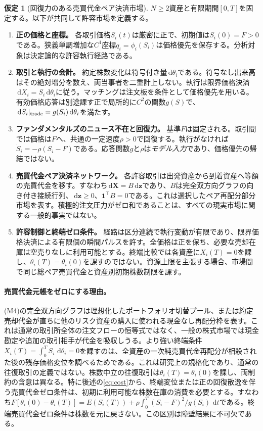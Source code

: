 \documentclass[11pt]{article}
\numberwithin{equation}{section}
\theoremstyle{definition}
\newtheorem{assumption}[theorem]{仮定}
\theoremstyle{remark}
\newcommand{\dd}{\,\mathrm{d}}
\newcommand{\one}{\mathbf{1}}
\begin{document}
\begin{assumption}[回復力のある売買代金ペア決済市場]\label{asmp:model}
$N\ge2$資産と有限期間$[0,T]$を固定する。以下が共同して許容市場を定義する。
\begin{enumerate}[label=\textup{(M\arabic*)},leftmargin= 2.9 em,itemsep= 0.20 em]
\item \textbf{正の価格と座標。} 各取引価格$S_i(t)$は厳密に正で、初期値は$S_i(0)=F>0$である。狭義単調増加な$C^1$座標$q_i=\phi_i(S_i)$は価格優先を保存する。分析対象は決定論的な許容執行経路である。
\item \textbf{取引と執行の会計。} 約定株数変化は符号付き量$\dd\theta_i$である。符号なし出来高はその絶対増分を数え、両当事者を二重計上しない。執行は限界価格決済$\dd X_i=S_i\dd\theta_i$に従う。マッチングは注文板を条件として価格優先を用いる。有効価格応答は別途課す正で局所的に$C^2$の関数$g(S)$で、$\dd S_i|_{\rm trade}=g(S_i)\dd\theta_i$を満たす。
\item \textbf{ファンダメンタルズのニュース不在と回復力。} 基準$F$は固定される。取引間では価格は$F$へ、共通の一定速度$\rho>0$で回復する。執行がなければ$\dot S_i=-\rho(S_i-F)$である。応答関数$g$と$\rho$は\emph{モデル入力}であり、価格優先の帰結ではない。
\item \textbf{売買代金ペア決済ネットワーク。} 各許容取引は出発資産から到着資産へ等額の売買代金を移す。すなわち$\dd\bm X=B\dd\bm z$であり、$B$は完全双方向グラフの向き付き接続行列、$\dd\bm z\ge0$、$\one^\top B=0$である。これは選択したペア再配分部分市場を表す。積極的注文圧力がゼロ和であることは、すべての現実市場に関する一般的事実ではない。
\item \textbf{許容制御と終端ゼロ条件。} 経路は区分連続で執行変動が有限であり、限界価格決済による有限個の瞬間パルスを許す。全価格は正を保ち、必要な売却在庫は空売りなしに利用可能とする。終端比較では各資産に$X_i(T)=0$を課し、$\theta_i(T)=\theta_i(0)$を課すのではない。資源上限を主張する場合、市場間で同じ総ペア売買代金と資産別初期株数制限を課す。
\end{enumerate}
\end{assumption}



\paragraph{売買代金元帳をゼロにする理由。}
(M4)の完全双方向グラフは理想化したポートフォリオ切替プール、または約定売却代金が直ちに他のリスク資産の購入に使われる現金なし再配分枠を表す。これは通常の取引所全体の注文フローの恒等式ではなく、一般の株式市場では現金勘定や追加の取引相手が代金を吸収しうる。より強い終端条件$X_i(T)=\int_0^T S_i\,\dd\theta_i=0$を課すのは、全資産の一次純売買代金再配分が相殺された後の残存価格変位を調べるためである。これは研究上の規格化であり、通常の往復取引の定義ではない。株数中立の往復取引は$\theta_i(T)=\theta_i(0)$を課し、両制約の含意は異なる。特に後述の\eqref{eq:cost}から、終端変位または正の回復散逸を伴う売買代金ゼロ条件は、初期に利用可能な株数在庫の消費を必要とする。すなわち$F[\theta_i(0)-\theta_i(T)]=E(S_i(T))+\rho\int_0^T(S_i-F)^2/g(S_i)\,\dd t$である。終端売買代金ゼロ条件は株数を元に戻さない。この区別は障壁結果に不可欠である。
\end{document}
